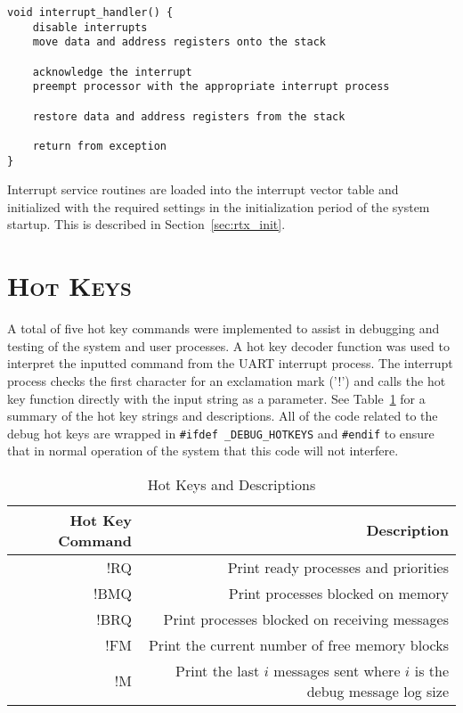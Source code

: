 \documentclass[oneside]{report}
\begin{document}
\begin{lstlisting}
void interrupt_handler() {
    disable interrupts
    move data and address registers onto the stack

    acknowledge the interrupt
    preempt processor with the appropriate interrupt process

    restore data and address registers from the stack

    return from exception
}
\end{lstlisting}

Interrupt service routines are loaded into the interrupt vector table and
initialized with the required settings in the initialization period of the
system startup. This is described in Section~\ref{sec:rtx_init}.

\section{\textsc{Hot Keys}}

A total of five hot key commands were implemented to assist in debugging and
testing of the system and user processes. A hot key decoder function was used to
interpret the inputted command from the UART interrupt process. The interrupt
process checks the first character for an exclamation mark ('!') and calls the
hot key function directly with the input string as a parameter. See
Table~\ref{hot_keys_table} for a summary of the hot key strings and
descriptions. All of the code related to the debug hot keys are wrapped in
\texttt{\#ifdef \_DEBUG\_HOTKEYS} and \texttt{\#endif} to ensure that in normal
operation of the system that this code will not interfere.

\begin{table}[h]
    \caption{Hot Keys and Descriptions}
    \label{hot_keys_table}
    \begin{tabular}{| r | r |}
        \hline
        Hot Key Command & Description \\
        \hline
        !RQ & Print ready processes and priorities \\ 
        !BMQ & Print processes blocked on memory \\ 
        !BRQ & Print processes blocked on receiving messages \\ 
        !FM & Print the current number of free memory blocks \\ 
        !M & Print the last $i$ messages sent where $i$ is the debug message
        log size \\
        \hline
    \end{tabular}
\end{table}
\end{document}
